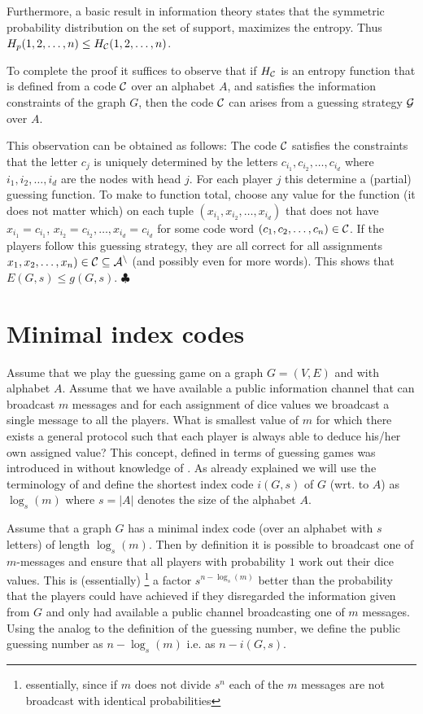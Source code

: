 \documentclass[12pt]{article}
\begin{document}
Furthermore, a basic result in information theory states that the symmetric probability distribution on the set of support, maximizes the entropy. Thus $H_p(1,2,\ldots,n) \leq H_{\cal{C}}(1,2,\ldots,n)$.

To complete the proof it suffices to observe that if  $H_{\cal{C}}$ is an entropy function that is defined from a code $\cal{C}$ over an alphabet $A$, and satisfies the information constraints of the graph $G$, then the code $\cal{C}$ can arises from a guessing strategy $\cal{G}$  over $A$. 

This observation can be obtained as follows: The code $\cal{C}$ satisfies the constraints that the letter $c_j$ is uniquely determined by the letters $c_{i_1},c_{i_2}, \ldots, c_{i_d}$ where $i_1,i_2, \ldots,i_d$ are the nodes with head $j$.
For each player $j$ this determine a (partial) guessing function. To make to function total, choose any value for the function (it does not matter which) on each tuple $(x_{i_1}, x_{i_2}, \ldots,x_{i_d})$ that does not have 
$x_{i_1}=c_{i_1}$, $x_{i_2}=c_{i_2}, \ldots, x_{i_d}=c_{i_d}$ for some code word $(c_1,c_2, \ldots,c_n) \in \cal{C}$. If the players follow this guessing strategy, they are all correct for all assignments 
$x_1,x_2, \ldots,x_n) \in \cal{C} \subseteq A^n$ (and possibly even for more words).
This shows that $E(G,s) \leq g(G,s)$. \hfill $\clubsuit$

\section{Minimal index codes}
Assume that we play the guessing game on a graph $G=(V,E)$ and with alphabet $A$.  Assume that we have available a public information channel that can broadcast $m$ messages and for each assignment of dice values we broadcast a single message to all the players. What is smallest value of $m$ for which there exists a general protocol such that each player is always able to deduce his/her own assigned value? This concept, defined in terms of guessing games was introduced in \cite{Riis05} without knowledge of \cite{Tel98}.  As already explained we will use the terminology of \cite{Tel98} and define the shortest index code $i(G,s)$
of $G$ (wrt. to $A$) as $\log_{s}(m)$ where $s=|A|$ denotes the size of the alphabet $A$.  

Assume that a graph $G$ has a minimal index code (over an alphabet with $s$ letters) of length 
$\log_s(m)$. Then by definition it is possible to broadcast one of $m$-messages and ensure that
all players with probability $1$ work out their dice values. This is (essentially) \footnote{essentially, since if $m$ does not divide $s^n$ each of the $m$ messages are not broadcast with identical probabilities} a factor 
$s^{n-\log_{s}(m)}$ better than the probability that the players could have achieved if they disregarded the information given from $G$ and only had available a public channel broadcasting one of $m$ messages. Using the analog to the definition of the guessing number, we define the public guessing number as $n-\log_s(m)$ i.e. as $n-i(G,s)$.
\end{document}
